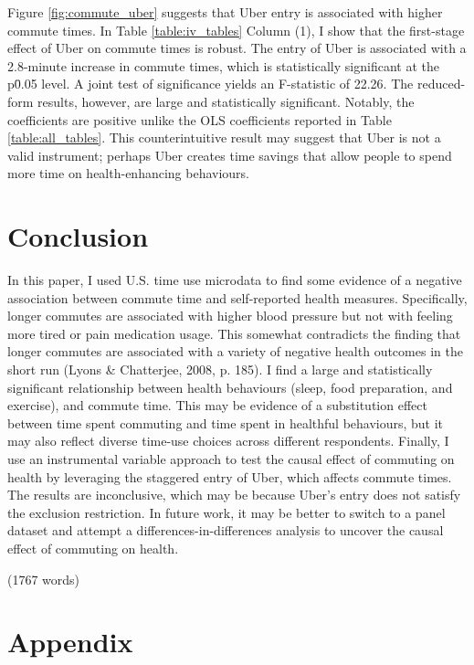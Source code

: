 \documentclass{eco481_paper}
\begin{document}
Figure \ref*{fig:commute_uber} suggests that Uber entry is associated with higher commute times. In Table \ref*{table:iv_tables} Column (1), I show that the first-stage effect of Uber on commute times is robust. The entry of Uber is associated with a 2.8-minute increase in commute times, which is statistically significant at the p\=0.05 level. A joint test of significance yields an F-statistic of 22.26. The reduced-form results, however, are large and statistically significant. Notably, the coefficients are positive unlike the OLS coefficients reported in Table \ref*{table:all_tables}. This counterintuitive result may suggest that Uber is not a valid instrument; perhaps Uber creates time savings that allow people to spend more time on health-enhancing behaviours. 

\section*{Conclusion}
In this paper, I used U.S. time use microdata to find some evidence of a negative association between commute time and self-reported health measures. Specifically, longer commutes are associated with higher blood pressure but not with feeling more tired or pain medication usage. This somewhat contradicts the finding that longer commutes are associated with a variety of negative health outcomes in the short run (Lyons \& Chatterjee, 2008, p. 185). I find a large and statistically significant relationship between health behaviours (sleep, food preparation, and exercise), and commute time. This may be evidence of a substitution effect between time spent commuting and time spent in healthful behaviours, but it may also reflect diverse time-use choices across different respondents. Finally, I use an instrumental variable approach to test the causal effect of commuting on health by leveraging the staggered entry of Uber, which affects commute times. The results are inconclusive, which may be because Uber's entry does not satisfy the exclusion restriction. In future work, it may be better to switch to a panel dataset and attempt a differences-in-differences analysis to uncover the causal effect of commuting on health.


(1767 words)

\newpage
\printbibliography

\newpage
\section*{Appendix}
\landscape
{}
\end{document}
